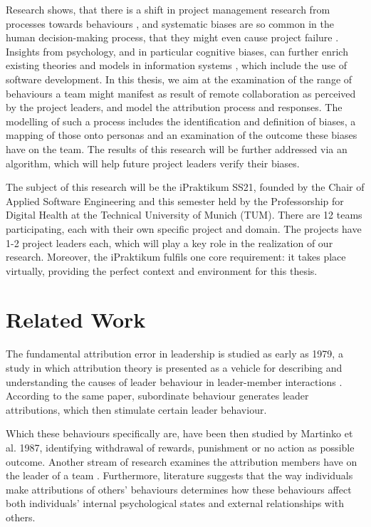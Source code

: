 \documentclass[a4paper]{article}
\begin{document}
Research shows, that there is a shift in project management research from processes towards behaviours \cite{Leybourne2007}, and systematic biases are so common in the human decision-making process, that they might even cause project failure \cite{Shore2008}. Insights from  psychology, and in particular cognitive biases, can further enrich existing theories and models in information systems \cite{Fleischmann2014}, which include the use of software development. In this thesis, we aim at the examination of the range of behaviours a team might manifest as result of remote collaboration as perceived by the project leaders, and model the attribution process and responses. The modelling of such a process includes the identification and definition of biases, a mapping of those onto personas and an examination of the outcome these biases have on the team. The results of this research will be further addressed via an algorithm, which will help future project leaders verify their biases.

The subject of this research will be the iPraktikum SS21, founded by the Chair of Applied Software Engineering and this semester held by the Professorship for Digital Health at the Technical University of Munich (TUM). There are 12 teams participating, each with their own specific project and domain. The projects have 1-2 project leaders each, which will play a key role in the realization of our research. Moreover, the iPraktikum fulfils one core requirement: it takes place virtually, providing the perfect context and environment for this thesis.

\section{Related Work}

The fundamental attribution error in leadership is studied as early as 1979, a study in which attribution theory is presented as a vehicle for describing and understanding the causes of leader behaviour in leader-member interactions \cite{Green1979}. According to the same paper, subordinate behaviour generates leader attributions, which then stimulate certain leader behaviour. 

Which these behaviours specifically are, have been then studied by Martinko et al. 1987, identifying withdrawal of rewards, punishment or no action as possible outcome. Another stream of research examines the attribution members have on the leader of a team \cite{Sweet2020}. Furthermore, literature \cite{Gardner2018} suggests that the way individuals make attributions of others' behaviours determines how these behaviours affect both individuals' internal psychological states and external relationships with others.
\end{document}
